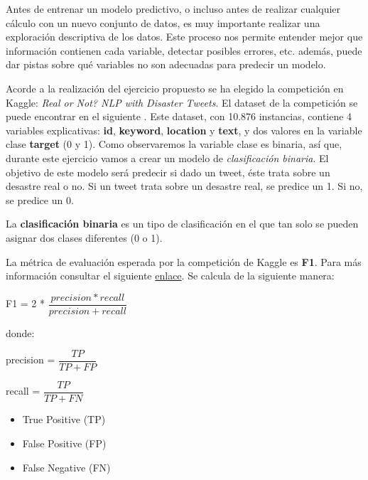 \documentclass[]{article}
\begin{document}
Antes de entrenar un modelo predictivo, o incluso antes de realizar
cualquier cálculo con un nuevo conjunto de datos, es muy importante
realizar una exploración descriptiva de los datos. Este proceso nos
permite entender mejor que información contienen cada variable, detectar
posibles errores, etc. además, puede dar pistas sobre qué variables no
son adecuadas para predecir un modelo.

Acorde a la realización del ejercicio propuesto se ha elegido la
competición en Kaggle: \emph{Real or Not? NLP with Disaster Tweets}.
El dataset de la competición se puede encontrar en el siguiente \href{https://www.kaggle.com/c/nlp-getting-started/data}{\color{blue}{enlace}}. Este dataset,
con 10.876 instancias, contiene 4 variables explicativas: \textbf{id},
\textbf{keyword}, \textbf{location} y \textbf{text}, y dos valores en la
variable clase \textbf{target} (0 y 1). Como observaremos la
variable clase es binaria, así que, durante este ejercicio vamos a
crear un modelo de \emph{clasificación binaria}. El objetivo de este
modelo será predecir si dado un tweet, éste trata sobre un desastre real
o no. Si un tweet trata sobre un desastre real, se predice un 1. Si no,
se predice un 0.

\begin{tcolorbox}
La \textbf{clasificación binaria} es un tipo de clasificación en el que tan solo se pueden asignar dos clases diferentes (0 o 1).	
\end{tcolorbox}

La métrica de evaluación esperada por la competición de Kaggle es \textbf{F1}. Para más información consultar el siguiente \href{https://www.kaggle.com/c/nlp-getting-started/overview/evaluation}{\color{blue}enlace}. Se calcula de la siguiente manera:

\vspace{3mm}

\begin{center}
	F1 = 2 * $\dfrac{precision * recall}{precision + recall}$
\end{center}

donde:

\begin{center}	
	precision = $\dfrac{TP}{TP + FP}$
	
	recall = $\dfrac{TP}{TP + FN}$
\end{center}

\begin{itemize}
	\item True Positive (TP)
	\item False Positive (FP)
	\item False Negative (FN)
\end{itemize}
\end{document}
